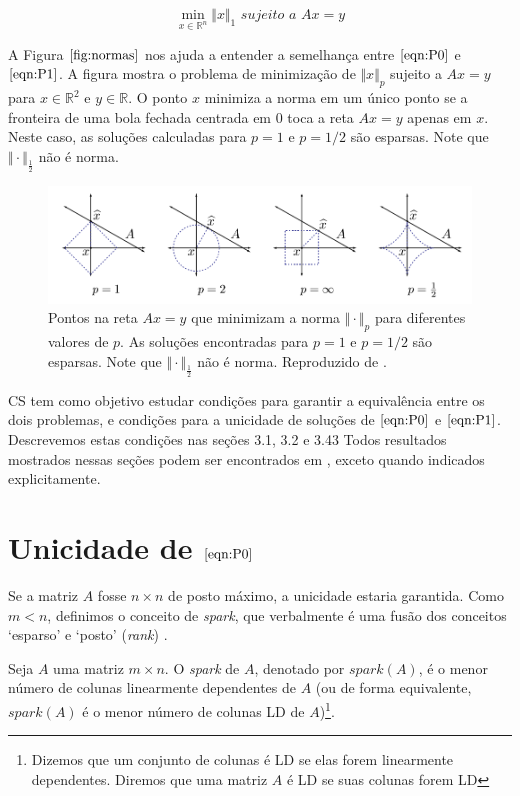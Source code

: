 \begin{equation}
\tag{$P_1$}
\min_{x \in \mathbb{R}^n} \Vert x \Vert_{1} \textit{ sujeito a } Ax = y
\label{eqn:P1}
\end{equation}

A Figura $\ref{fig:normas}$ nos ajuda a entender a semelhança entre $\eqref{eqn:P0}$ e $\eqref{eqn:P1}$. A figura mostra o problema de minimização de $\Vert x \Vert_p$ sujeito a $Ax = y$ para $x \in \mathbb{R}^2$ e $y \in \mathbb{R}$. O ponto $x$ minimiza a norma em um único ponto se a fronteira de uma bola fechada centrada em $0$ toca a reta $Ax = y$ apenas em $x$. Neste caso, as soluções calculadas para $p = 1$ e $p = 1/2$ são esparsas. Note que $\Vert \cdot \Vert_{\frac{1}{2}}$ não é norma.

\begin{figure}
\centering
\includegraphics[scale=.6]{imagens/normas.png}
\caption{Pontos na reta $Ax = y$ que minimizam a norma $\Vert \cdot \Vert_p$ para diferentes valores de $p$. As soluções encontradas para $p = 1$ e $p = 1/2$ são esparsas. Note que $\Vert \cdot \Vert_{\frac{1}{2}}$ não é norma. Reproduzido de \cite{ddek}.}
\label{fig:normas}
\end{figure}

CS tem como objetivo estudar condições para garantir a equivalência entre os dois problemas, e condições para a unicidade de soluções de $\eqref{eqn:P0}$ e $\eqref{eqn:P1}$. Descrevemos estas condições nas seções 3.1, 3.2 e 3.43 Todos resultados mostrados nessas seções podem ser encontrados em \cite{ddek}, exceto quando indicados explicitamente.

\section{Unicidade de $\eqref{eqn:P0}$}
Se a matriz $A$ fosse $n \times n$ de posto máximo, a unicidade estaria garantida. Como $m < n$, definimos o conceito de \textit{spark}, que verbalmente é uma fusão dos conceitos `esparso' e `posto' (\textit{rank}) \cite{kutyniok}.

\begin{definicao}
Seja $A$ uma matriz $m \times n$. O \textit{spark} de $A$, denotado por $\textit{spark}(A)$, é o menor número de colunas linearmente dependentes de $A$ (ou de forma equivalente, $spark(A)$ é o menor número de colunas LD de $A$)\footnote{Dizemos que um conjunto de colunas é LD se elas forem linearmente dependentes. Diremos que uma matriz $A$ é LD se suas colunas forem LD}.
\end{definicao}

